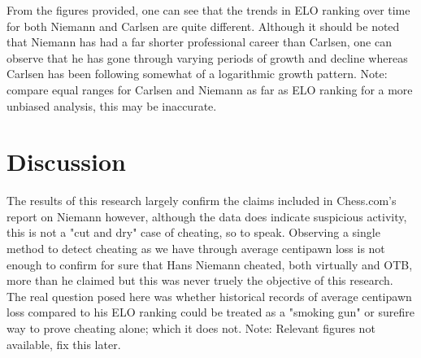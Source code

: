 \documentclass[12pt]{article}
\begin{document}

From the figures provided, one can see that the trends in ELO ranking over time for both Niemann and Carlsen are quite different. Although it should be noted that Niemann has had a far shorter professional career than Carlsen, one can observe that he has gone through varying periods of growth and decline whereas Carlsen has been following somewhat of a logarithmic growth pattern. Note: compare equal ranges for Carlsen and Niemann as far as ELO ranking for a more unbiased analysis, this may be inaccurate.

\section*{Discussion}
\label{sec:disc}

The results of this research largely confirm the claims included in Chess.com's report on Niemann however, although the data does indicate suspicious activity, this is not a "cut and dry" case of cheating, so to speak. Observing a single method to detect cheating as we have through average centipawn loss is not enough to confirm for sure that Hans Niemann cheated, both virtually and OTB, more than he claimed but this was never truely the objective of this research. The real question posed here was whether historical records of average centipawn loss compared to his ELO ranking could be treated as a "smoking gun" or surefire way to prove cheating alone; which it does not. Note: Relevant figures not available, fix this later. 



\end{document}
